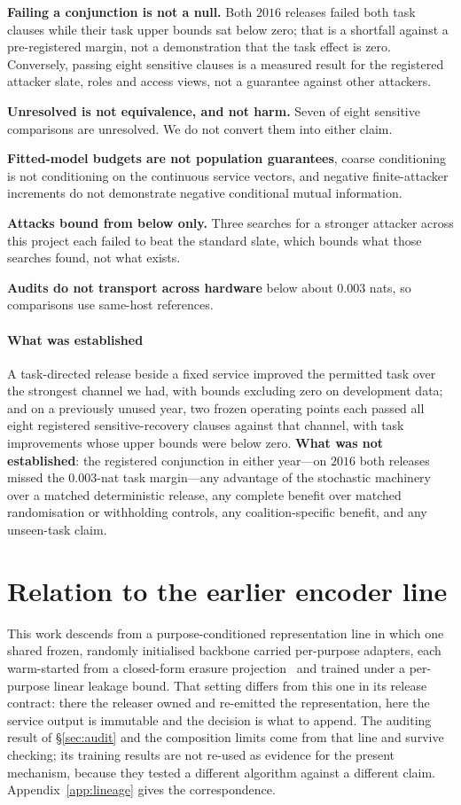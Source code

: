 \documentclass[conference]{IEEEtran}
\begin{document}
\textbf{Failing a conjunction is not a null.} Both $2016$ releases failed both task clauses while their
task upper bounds sat below zero; that is a shortfall against a pre-registered margin, not a demonstration
that the task effect is zero. Conversely, passing eight sensitive clauses is a measured result for the
registered attacker slate, roles and access views, not a guarantee against other attackers.

\textbf{Unresolved is not equivalence, and not harm.} Seven of eight sensitive comparisons are unresolved.
We do not convert them into either claim.

\textbf{Fitted-model budgets are not population guarantees}, coarse conditioning is not conditioning on the
continuous service vectors, and negative finite-attacker increments do not demonstrate negative conditional
mutual information.

\textbf{Attacks bound from below only.} Three searches for a stronger attacker across this project each
failed to beat the standard slate, which bounds what those searches found, not what exists.

\textbf{Audits do not transport across hardware} below about $0.003$ nats, so comparisons use same-host
references.

\paragraph{What was established} A task-directed release beside a fixed service improved the permitted task
over the strongest channel we had, with bounds excluding zero on development data; and on a previously
unused year, two frozen operating points each passed all eight registered sensitive-recovery clauses
against that channel, with task improvements whose upper bounds were below zero. \textbf{What was not
established}: the registered conjunction in either year---on $2016$ both releases missed the $0.003$-nat
task margin---any advantage of the stochastic machinery over a matched deterministic release, any complete
benefit over matched randomisation or withholding controls, any coalition-specific benefit, and any
unseen-task claim.

\section{Relation to the earlier encoder line}
\label{sec:lineage}

This work descends from a purpose-conditioned representation line in which one shared frozen, randomly
initialised backbone carried per-purpose adapters, each warm-started from a closed-form erasure projection~\cite{belrose2023leace} and trained under a
per-purpose linear leakage bound. That setting differs from this one in its release contract: there the
releaser owned and re-emitted the representation, here the service output is immutable and the decision is
what to append. The auditing result of \S\ref{sec:audit} and the composition limits come from that line and
survive checking; its training results are not re-used as evidence for the present mechanism, because they
tested a different algorithm against a different claim. Appendix~\ref{app:lineage} gives the correspondence.
\end{document}
